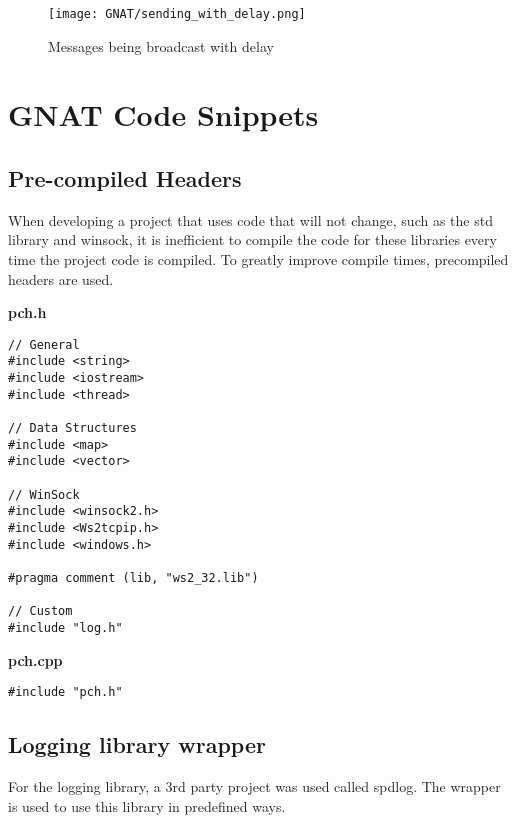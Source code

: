 \begin{figure}[!h]
  \centering
  \texttt{[image: GNAT/sending\_with\_delay.png]}
  \caption{Messages being broadcast with delay}
  \label{fig:broadcast_with_delay}
\end{figure}

\chapter{GNAT Code Snippets}

\section{Pre-compiled Headers}
When developing a project that uses code that will not change, such as the std library and winsock, it is inefficient to compile the code for these libraries every time the project code is compiled. To greatly improve compile times, precompiled headers are used.

\textbf{pch.h}
\begin{lstlisting}
// General
#include <string>
#include <iostream>
#include <thread>

// Data Structures
#include <map>
#include <vector>

// WinSock
#include <winsock2.h>
#include <Ws2tcpip.h>
#include <windows.h>

#pragma comment (lib, "ws2_32.lib")

// Custom
#include "log.h"
\end{lstlisting}

\textbf{pch.cpp}
\begin{lstlisting}
#include "pch.h"
\end{lstlisting}


\section{Logging library wrapper}
For the logging library, a 3rd party project was used called spdlog. The wrapper is used to use this library in predefined ways.



